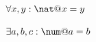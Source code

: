 \documentclass[a4paper,10pt,fleqn]{article}
\begin{document}
\noindent
$\forall x, y : \nat @ x = y$


\noindent
$\exists a, b, c : \num @ a = b$
\end{document}
